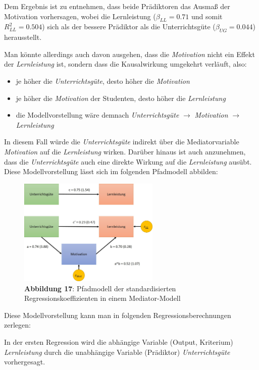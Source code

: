 \documentclass[]{article}
\providecommand{\tightlist}{%
  \setlength{\itemsep}{0pt}\setlength{\parskip}{0pt}}
\begin{document}
Dem Ergebnis ist zu entnehmen, dass beide Prädiktoren das Ausmaß der Motivation vorhersagen, wobei die Lernleistung (\(\beta_{LL} = 0.71\) und somit \(R_{LL}^2 = 0.504\)) sich als der bessere Prädiktor als die Unterrichtsgüte (\(\beta_{UG} = 0.044\)) herausstellt.

Man könnte allerdings auch davon ausgehen, dass die \emph{Motivation} nicht ein Effekt der \emph{Lernleistung} ist, sondern dass die Kausalwirkung umgekehrt verläuft, also:

\begin{itemize}
\tightlist
\item
  je höher die \emph{Unterrichtsgüte}, desto höher die \emph{Motivation}
\item
  je höher die \emph{Motivation} der Studenten, desto höher die \emph{Lernleistung}
\item
  die Modellvorstellung wäre demnach \emph{Unterrichtsgüte} \(\rightarrow\) \emph{Motivation} \(\rightarrow\) \emph{Lernleistung}
\end{itemize}

In diesem Fall würde die \emph{Unterrichtsgüte} indirekt über die Mediatorvariable \emph{Motivation} auf die \emph{Lernleistung} wirken. Darüber hinaus ist auch anzunehmen, dass die \emph{Unterrichtsgüte} auch eine direkte Wirkung auf die \emph{Lernleistung} ausübt. Diese Modellvorstellung lässt sich im folgenden Pfadmodell abbilden:

\begin{figure}
\centering
\includegraphics[width=0.6\textwidth,height=\textheight]{Images/Pfadanalyse_Modell2.jpg}
\caption{\textbf{Abbildung 17}: Pfadmodell der standardisierten Regressionskoeffizienten in einem Mediator-Modell}
\end{figure}

Diese Modellvorstellung kann man in folgenden Regressionsberechnungen zerlegen:

In der ersten Regression wird die abhängige Variable (Output, Kriterium) \emph{Lernleistung} durch die unabhängige Variable (Prädiktor) \emph{Unterrichtsgüte} vorhergesagt.
\end{document}
